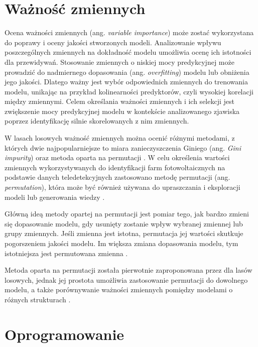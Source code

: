 \documentclass{amuthesis}
\begin{document}
\hypertarget{sec-variable-importance}{%
\section{Ważność zmiennych}\label{sec-variable-importance}}

Ocena ważności zmiennych (ang. \emph{variable importance}) może zostać
wykorzystana do poprawy i oceny jakości stworzonych modeli. Analizowanie
wpływu poszczególnych zmiennych na dokładność modelu umożliwia ocenę ich
istotności dla przewidywań. Stosowanie zmiennych o niskiej mocy
predykcyjnej może prowadzić do nadmiernego dopasowania (ang.
\emph{overfitting}) modelu lub obniżenia jego jakości. Dlatego ważny
jest wybór odpowiednich zmiennych do trenowania modelu, unikając na
przykład kolinearności predyktorów, czyli wysokiej korelacji między
zmiennymi. Celem określania ważności zmiennych i ich selekcji jest
zwiększenie mocy predykcyjnej modelu w kontekście analizowanego zjawiska
poprzez identyfikację silnie skorelowanych z nim zmiennych.

W lasach losowych ważność zmiennych można ocenić różnymi metodami, z
których dwie najpopularniejsze to miara zanieczyszczenia Giniego (ang.
\emph{Gini impurity}) oraz metoda oparta na permutacji
\autocite{R-Przewodnik}. W celu określenia wartości zmiennych
wykorzystywanych do identyfikacji farm fotowoltaicznych na podstawie
danych teledetekcyjnych zastosowano metodę permutacji (ang.
\emph{permutation}), która może być również używana do upraszczania i
eksploracji modeli lub generowania wiedzy
\autocite{biecek_2021_model_analysis}.

Główną ideą metody opartej na permutacji jest pomiar tego, jak bardzo
zmieni się dopasowanie modelu, gdy usunięty zostanie wpływ wybranej
zmiennej lub grupy zmiennych. Jeśli zmienna jest istotna, permutacja jej
wartości skutkuje pogorszeniem jakości modelu. Im większa zmiana
dopasowania modelu, tym istotniejsza jest permutowana zmienna
\autocite{biecek_2021_model_analysis}.

Metoda oparta na permutacji została pierwotnie zaproponowana przez
\textcite{breiman_2001_rf} dla lasów losowych, jednak jej prostota
umożliwia zastosowanie permutacji do dowolnego modelu, a także
porównywanie ważności zmiennych pomiędzy modelami o różnych strukturach
\autocite{biecek_2021_model_analysis}.

\hypertarget{oprogramowanie}{%
\section{Oprogramowanie}\label{oprogramowanie}}
\end{document}
